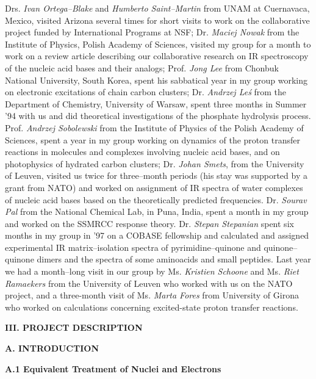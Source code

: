 \noindent
Drs. {\em Ivan Ortega--Blake}  and {\em Humberto Saint--Martin} from 
UNAM at Cuernavaca, Mexico, visited 
Arizona several times for short visits
to work on the collaborative
project funded by International Programs at NSF; 
Dr. {\em Maciej Nowak} from the Institute of
Physics, Polish Academy of Sciences, visited 
my group for a month to work on a review article describing
our collaborative research on IR spectroscopy of 
the nucleic acid bases and their analogs; 
Prof. {\em Jong Lee} from Chonbuk National University,
South Korea, spent his sabbatical year in my group 
working on electronic excitations of chain carbon clusters;
Dr. {\em Andrzej Le\'{s}} from the Department of Chemistry, 
University of Warsaw, spent three months in Summer '94 with us and did
theoretical investigations of the phosphate hydrolysis 
process. 
Prof. {\em Andrzej Sobolewski} from the Institute of
Physics of the Polish Academy of Sciences, 
spent a year in my group working on dynamics of the proton
transfer reactions in molecules and complexes involving nucleic 
acid bases, and on photophysics of hydrated carbon
clusters; 
Dr. {\em Johan Smets}, from the University 
of Leuven, visited us twice for three--month periods (his stay
was supported by a grant from NATO) and worked 
on assignment of IR spectra of water complexes of nucleic
acid bases based on the theoretically predicted 
frequencies.  
Dr. {\em Sourav Pal} from the National Chemical Lab,
in Puna, India, spent a month in my group and 
worked on the SSMRCC response theory.
Dr. {\em Stepan Stepanian} spent six months in my group 
in '97 on a COBASE fellowship and calculated and
assigned experimental IR matrix--isolation 
spectra of pyrimidine--quinone and quinone--quinone dimers
and the spectra of some aminoacids and small peptides.
Last year we had a month--long visit in our group by Ms.
{\em Kristien Schoone} and Ms. {\em Riet Ramaekers} 
from the University of Leuven
who worked with us on the NATO project, and a three-month visit
of Ms. {\em Marta Fores} from University of Girona who worked
on calculations concerning excited-state proton transfer
reactions.

\vspace{4mm}
\noindent
{\bf III.  PROJECT DESCRIPTION}

\vspace{2mm}
\noindent
{\bf A. INTRODUCTION}

\vspace{2mm}
\noindent
{\bf A.1 Equivalent Treatment of Nuclei and Electrons}

